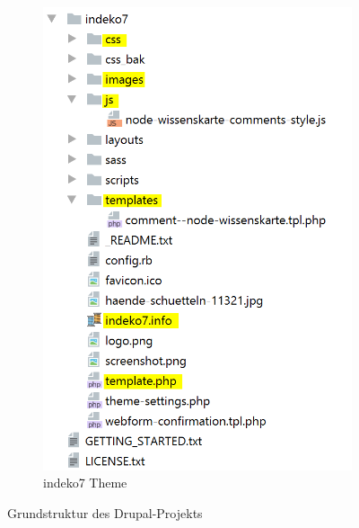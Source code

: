 \begin{figure}[!h]
\begin{subfigure}[b]{0.4\textwidth}
		\includegraphics[height=0.25\textheight]{images/structure_theme}
		\caption[]{indeko7 Theme}
		\label{fig:structuretheme}
	\end{subfigure}
	\caption{Grundstruktur des Drupal-Projekts}
	\label{fig:structure}
\end{figure}


